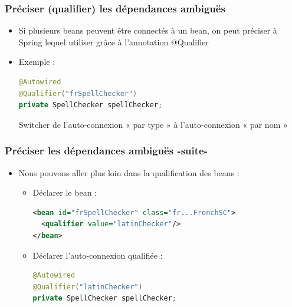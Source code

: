 \documentclass{beamer}
\begin{document}
\begin{frame}[fragile]
  \frametitle{Préciser (qualifier) les dépendances ambiguës}
  \begin{itemize}
  \item Si plusieurs beans peuvent être connectés à un bean, on peut
préciser à Spring lequel utiliser grâce à l'annotation @Qualifier
\item Exemple :
\begin{lstlisting}[language=Java,basicstyle=\scriptsize]    
@Autowired
@Qualifier("frSpellChecker")
private SpellChecker spellChecker;
\end{lstlisting}
Switcher de l'auto-connexion « par type » à l'auto-connexion « par nom »
\end{itemize}
\end{frame}

\begin{frame}[fragile]
  \frametitle{Préciser les dépendances ambiguës -suite-}
  \begin{itemize}
\item Nous pouvons aller plus loin dans la qualification des beans :
  \begin{itemize}
  \item Déclarer le bean :
\begin{lstlisting}[language=XML,basicstyle=\scriptsize]        
<bean id="frSpellChecker" class="fr...FrenchSC">
  <qualifier value="latinChecker"/>
</bean>
\end{lstlisting}
\item Déclarer l'auto-connexion qualifiée :
\begin{lstlisting}[language=Java,basicstyle=\scriptsize]          
@Autowired
@Qualifier("latinChecker")
private SpellChecker spellChecker;
\end{lstlisting}
\end{itemize}
\end{itemize}
\end{frame}
\end{document}
